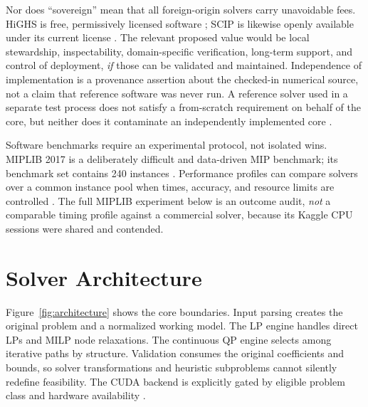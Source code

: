 \documentclass[10pt,a4paper,twocolumn]{article}
\begin{document}
Nor does ``sovereign'' mean that all foreign-origin solvers carry unavoidable fees. HiGHS is free, permissively licensed software \cite{highs}; SCIP is likewise openly available under its current license \cite{scip2025}. The relevant proposed value would be local stewardship, inspectability, domain-specific verification, long-term support, and control of deployment, \emph{if} those can be validated and maintained. Independence of implementation is a provenance assertion about the checked-in numerical source, not a claim that reference software was never run. A reference solver used in a separate test process does not satisfy a from-scratch requirement on behalf of the core, but neither does it contaminate an independently implemented core \cite{arch}.

Software benchmarks require an experimental protocol, not isolated wins. MIPLIB 2017 is a deliberately difficult and data-driven MIP benchmark; its benchmark set contains 240 instances \cite{miplibpaper,miplibsite}. Performance profiles can compare solvers over a common instance pool when times, accuracy, and resource limits are controlled \cite{dolanmore2002}. The full MIPLIB experiment below is an outcome audit, \emph{not} a comparable timing profile against a commercial solver, because its Kaggle CPU sessions were shared and contended.

\section{Solver Architecture}

Figure~\ref{fig:architecture} shows the core boundaries. Input parsing creates the original problem and a normalized working model. The LP engine handles direct LPs and MILP node relaxations. The continuous QP engine selects among iterative paths by structure. Validation consumes the original coefficients and bounds, so solver transformations and heuristic subproblems cannot silently redefine feasibility. The CUDA backend is explicitly gated by eligible problem class and hardware availability \cite{arch}.
\end{document}
